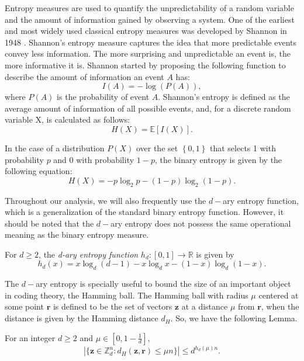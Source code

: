 Entropy measures are used to quantify the unpredictability of a random variable and the amount of information gained by observing a system. One of the earliest and most widely used classical entropy measures was developed by Shannon in 1948 \cite{S48}. Shannon's entropy measure captures the idea that more predictable events convey less information. The more surprising and unpredictable an event is, the more informative it is. Shannon started by proposing the following function to describe the amount of information an event $A$ has:
$$I(A) = - \log \left( P(A) \right),$$
where $P(A)$ is the probability of event $A$. Shannon's entropy is defined as the average amount of information of all possible events, and, for a discrete random variable X,  is calculated as follows:
$$H(X) = \mathbb{E}\left[ I(X) \right].$$

In the case of a distribution $P(X)$ over the set $\left\{0,1\right\}$ that selects 1 with probability $p$ and 0 with probability $1-p$, the binary entropy is given by the following equation:
$$H(X) = -p \log_2 p - (1-p)\log_2(1-p).$$

Throughout our analysis, we will also frequently use the $d-$ary entropy function, which is a generalization of the standard binary entropy function. However, it should be noted that the $d-$ary entropy does not possess the same operational meaning as the binary entropy measure.

\begin{definition}
For $d\geq 2$, the \textit{d-ary entropy function} $h_d : [0,1]\rightarrow\mathbb{R}$ is given by
$$h_d(x) = x \log_d(d-1) - x \log_d x - (1-x) \log_d (1-x).$$
\label{def:q-ary}
\end{definition}
The $d-$ary entropy is specially useful to bound the size of an important object in coding theory, the Hamming ball. The Hamming ball with radius $\mu$ centered at some point $\bm{r}$ is defined to be the set of vectors $\bm{z}$ at a distance $\mu$ from $\bm{r}$, when the distance is given by the Hamming distance $d_H$. So, we have the following Lemma.

\begin{lemma}
\label{lemma:hammingBall}
For an integer $d\geq 2$ and $\mu \in [0, 1-\frac{1}{d}]$,
\begin{equation*}
    |\{ \boldsymbol{z}\in \mathbb{Z}_d^{n}: d_H(\boldsymbol{z}, \boldsymbol{r})\leq \mu n \}| \leq d^{h_d(\mu)n}.
\end{equation*}
\end{lemma} 


